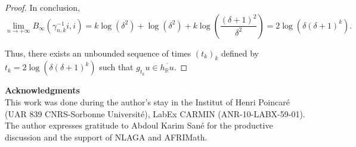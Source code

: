 \documentclass[11pt]{amsart}
\newtheorem{prp}{Proposition}
\begin{document}
\begin{proof}
In conclusion,
\[
\lim_{n \to +\infty} B_{\infty}(\gamma_{n,k}^{-1}i, i) = k \log(\delta^2) + \log(\delta^2) + k \log\left(\frac{(\delta + 1)^2}{\delta^2}\right) = 2 \log\left(\delta(\delta + 1)^k\right).
\]

Thus, there exists an unbounded sequence of times $(t_k)_k$ defined by $t_k = 2 \log\left(\delta(\delta + 1)^k\right)$ such that $g_{t_k}u \in \overline{h_{\mathbb{R}}u}$.
\end{proof}




\textbf{Acknowledgments}\\
This work was done during the author's stay in the Institut of Henri Poincaré  (UAR 839 CNRS-Sorbonne Université), LabEx CARMIN (ANR-10-LABX-59-01). The author expresses gratitude to Abdoul Karim Sané for the productive discussion and the support of NLAGA and AFRIMath.




\end{document}
